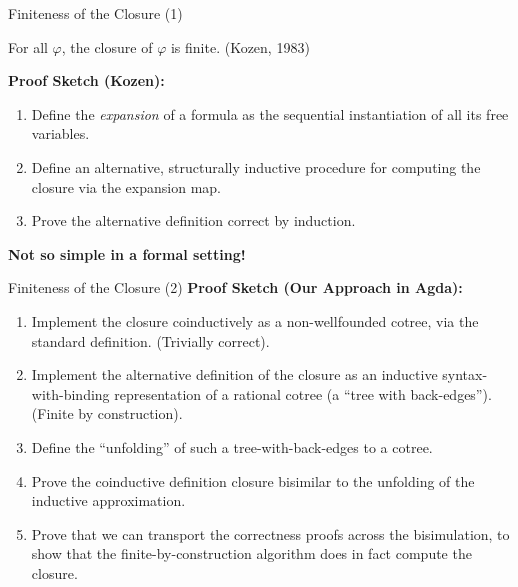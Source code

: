 \documentclass[aspectratio=169]{beamer}
\begin{document}
\begin{frame}{Finiteness of the Closure (1)}
  \begin{theorem}
    For all $\varphi$, the closure of $\varphi$ is finite. (Kozen, 1983)
  \end{theorem}

  \bigskip

  \textbf{Proof Sketch (Kozen):}
  \smallskip

 \begin{enumerate}
   \item Define the \emph{expansion} of a formula as the sequential instantiation of all its free variables.
         \smallskip
   \item Define an alternative, structurally inductive procedure for computing the closure via the expansion map.
         \smallskip
   \item Prove the alternative definition correct by induction.
 \end{enumerate}

 \bigskip

 \begin{center}
 \textbf{Not so simple in a formal setting!}
 \end{center}

\end{frame}

\begin{frame}{Finiteness of the Closure (2)}
  \textbf{Proof Sketch (Our Approach in Agda):}
  \smallskip

 \begin{enumerate}
   \item Implement the closure coinductively as a non-wellfounded cotree, via the standard definition. (Trivially correct).
         \pause
         \smallskip
   \item Implement the alternative definition of the closure as an inductive syntax-with-binding representation of a rational cotree (a ``tree with back-edges''). (Finite by construction).
         \pause
         \smallskip
   \item Define the ``unfolding'' of such a tree-with-back-edges to a cotree.
         \pause
         \smallskip
   \item Prove the coinductive definition closure bisimilar to the unfolding of the inductive approximation.
         \pause
         \smallskip
   \item Prove that we can transport the correctness proofs across the bisimulation, to show that the finite-by-construction algorithm does in fact compute the closure.
 \end{enumerate}
\end{frame}
\end{document}
